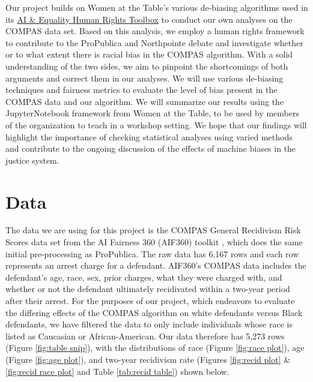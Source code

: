 \documentclass[water,article,submit,moreauthors,pdftex]{mdpi}
\begin{document}
Our project builds on Women at the Table's various de-biasing algorithms
used in its
\href{https://colab.research.google.com/drive/11SWijBDkr1pSgIXyjUkgoSB0gh5oAlaI}{AI
\& Equality Human Rights Toolbox} to conduct our own analyses on the
COMPAS data set. Based on this analysis, we employ a human rights
framework to contribute to the ProPublica and Northpointe debate and
investigate whether or to what extent there is racial bias in the COMPAS
algorithm. With a solid understanding of the two sides, we aim to
pinpoint the shortcomings of both arguments and correct them in our
analyses. We will use various de-biasing techniques and fairness metrics
to evaluate the level of bias present in the COMPAS data and our
algorithm. We will summarize our results using the JupyterNotebook
framework from Women at the Table, to be used by members of the
organization to teach in a workshop setting. We hope that our findings
will highlight the importance of checking statistical analyses using
varied methods and contribute to the ongoing discussion of the effects
of machine biases in the justice system.

\hypertarget{data}{%
\section{Data}\label{data}}

The data we are using for this project is the COMPAS General Recidivism
Risk Scores data set from the AI Fairness 360 (AIF360) toolkit
\citep{aif360-oct-2018}, which does the same initial pre-processing as
ProPublica. The raw data has 6,167 rows and each row represents an
arrest charge for a defendant. AIF360's COMPAS data includes the
defendant's age, race, sex, prior charges, what they were charged with,
and whether or not the defendant ultimately recidivated within a
two-year period after their arrest. For the purposes of our project,
which endeavors to evaluate the differing effects of the COMPAS
algorithm on white defendants versus Black defendants, we have filtered
the data to only include individuals whose race is listed as Caucasian
or African-American. Our data therefore has 5,273 rows (Figure
\ref{fig:table snip}), with the distributions of race (Figure
\ref{fig:race plot}), age (Figure \ref{fig:age plot}), and two-year
recidivism rate (Figures \ref{fig:recid plot} \&
\ref{fig:recid race plot} and Table \ref{tab:recid table}) shown below.
\end{document}
